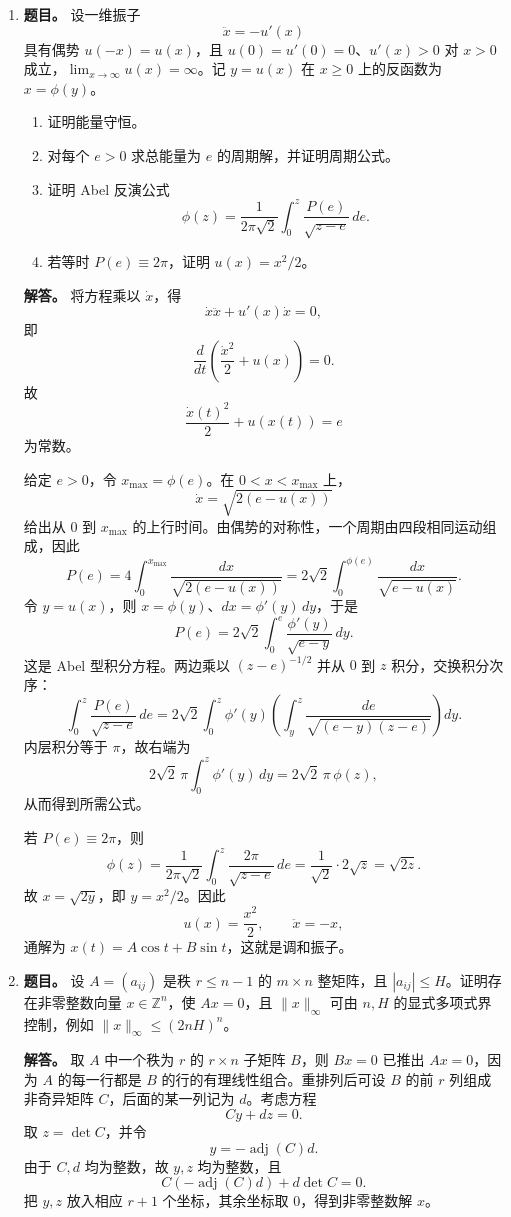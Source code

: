 ﻿\documentclass[UTF8,12pt]{ctexart}
\begin{document}
\begin{enumerate}[label=\textbf{\arabic*.},leftmargin=2.2em]
\item \textbf{题目。} 设一维振子
\[
\ddot x=-u'(x)
\]
具有偶势 \(u(-x)=u(x)\)，且 \(u(0)=u'(0)=0\)、\(u'(x)>0\) 对 \(x>0\) 成立，\(\lim_{x\to\infty}u(x)=\infty\)。记 \(y=u(x)\) 在 \(x\ge0\) 上的反函数为 \(x=\phi(y)\)。
\begin{enumerate}[label=(\alph*),leftmargin=2em]
\item 证明能量守恒。
\item 对每个 \(e>0\) 求总能量为 \(e\) 的周期解，并证明周期公式。
\item 证明 Abel 反演公式
\[
\phi(z)=\frac1{2\pi\sqrt2}\int_0^z \frac{P(e)}{\sqrt{z-e}}\,de .
\]
\item 若等时 \(P(e)\equiv2\pi\)，证明 \(u(x)=x^2/2\)。
\end{enumerate}

\textbf{解答。} 将方程乘以 \(\dot x\)，得
\[
\dot x\ddot x+u'(x)\dot x=0,
\]
即
\[
\frac d{dt}\left(\frac{\dot x^2}{2}+u(x)\right)=0.
\]
故
\[
\frac{\dot x(t)^2}{2}+u(x(t))=e
\]
为常数。

给定 \(e>0\)，令 \(x_{\max}=\phi(e)\)。在 \(0<x<x_{\max}\) 上，
\[
\dot x=\sqrt{2(e-u(x))}
\]
给出从 \(0\) 到 \(x_{\max}\) 的上行时间。由偶势的对称性，一个周期由四段相同运动组成，因此
\[
P(e)=4\int_0^{x_{\max}}\frac{dx}{\sqrt{2(e-u(x))}}
    =2\sqrt2\int_0^{\phi(e)}\frac{dx}{\sqrt{e-u(x)}} .
\]
令 \(y=u(x)\)，则 \(x=\phi(y)\)、\(dx=\phi'(y)\,dy\)，于是
\[
P(e)=2\sqrt2\int_0^e \frac{\phi'(y)}{\sqrt{e-y}}\,dy .
\]
这是 Abel 型积分方程。两边乘以 \((z-e)^{-1/2}\) 并从 \(0\) 到 \(z\) 积分，交换积分次序：
\[
\int_0^z \frac{P(e)}{\sqrt{z-e}}\,de
=2\sqrt2\int_0^z\phi'(y)
 \left(\int_y^z \frac{de}{\sqrt{(e-y)(z-e)}}\right)dy .
\]
内层积分等于 \(\pi\)，故右端为
\[
2\sqrt2\,\pi\int_0^z\phi'(y)\,dy=2\sqrt2\,\pi\,\phi(z),
\]
从而得到所需公式。

若 \(P(e)\equiv2\pi\)，则
\[
\phi(z)=\frac{1}{2\pi\sqrt2}\int_0^z\frac{2\pi}{\sqrt{z-e}}\,de
       =\frac1{\sqrt2}\cdot 2\sqrt z
       =\sqrt{2z}.
\]
故 \(x=\sqrt{2y}\)，即 \(y=x^2/2\)。因此
\[
u(x)=\frac{x^2}{2},\qquad \ddot x=-x,
\]
通解为 \(x(t)=A\cos t+B\sin t\)，这就是调和振子。

\item \textbf{题目。} 设 \(A=(a_{ij})\) 是秩 \(r\le n-1\) 的 \(m\times n\) 整矩阵，且 \(|a_{ij}|\le H\)。证明存在非零整数向量 \(x\in\mathbb Z^n\)，使 \(Ax=0\)，且 \(\|x\|_\infty\) 可由 \(n,H\) 的显式多项式界控制，例如 \(\|x\|_\infty\le (2nH)^n\)。

\textbf{解答。} 取 \(A\) 中一个秩为 \(r\) 的 \(r\times n\) 子矩阵 \(B\)，则 \(Bx=0\) 已推出 \(Ax=0\)，因为 \(A\) 的每一行都是 \(B\) 的行的有理线性组合。重排列后可设 \(B\) 的前 \(r\) 列组成非奇异矩阵 \(C\)，后面的某一列记为 \(d\)。考虑方程
\[
C y+d z=0.
\]
取 \(z=\det C\)，并令
\[
y=-\operatorname{adj}(C)d.
\]
由于 \(C,d\) 均为整数，故 \(y,z\) 均为整数，且
\[
C(-\operatorname{adj}(C)d)+d\det C=0.
\]
把 \(y,z\) 放入相应 \(r+1\) 个坐标，其余坐标取 \(0\)，得到非零整数解 \(x\)。


\end{enumerate}
\end{document}
